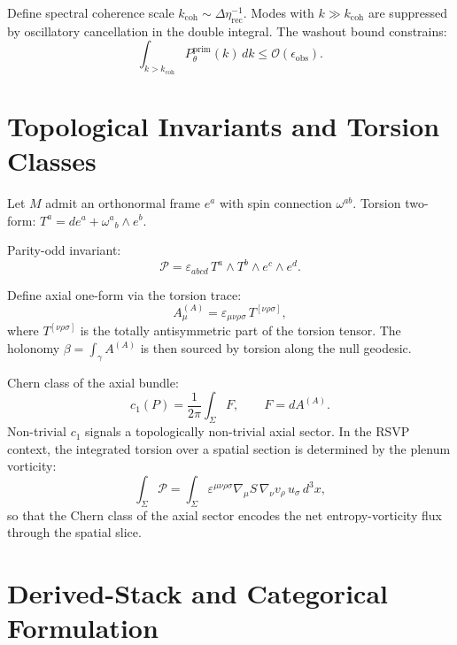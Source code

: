 \documentclass[12pt]{article}
\theoremstyle{definition}
\newcommand{\Wrec}{\Delta\eta_{\mathrm{rec}}}
\begin{document}
Define spectral coherence scale $k_{\mathrm{coh}}\sim\Wrec^{-1}$.
Modes with $k\gg k_{\mathrm{coh}}$ are suppressed by oscillatory
cancellation in the double integral.
The washout bound constrains:
\begin{equation}
  \int_{k>k_{\mathrm{coh}}}P_\theta^{\mathrm{prim}}(k)\,dk
  \leq\mathcal{O}(\epsilon_{\mathrm{obs}}).
\end{equation}

\section{Topological Invariants and Torsion Classes}
\label{app:torsion}

Let $M$ admit an orthonormal frame $e^a$ with spin connection $\omega^{ab}$.
Torsion two-form: $T^a=de^a+\omega^a{}_b\wedge e^b$.

Parity-odd invariant:
\begin{equation}
  \mathcal{P}=\varepsilon_{abcd}\,T^a\wedge T^b\wedge e^c\wedge e^d.
\end{equation}

Define axial one-form via the torsion trace:
\begin{equation}
  A^{(A)}_\mu=\varepsilon_{\mu\nu\rho\sigma}\,T^{[\nu\rho\sigma]},
\end{equation}
where $T^{[\nu\rho\sigma]}$ is the totally antisymmetric part of
the torsion tensor.
The holonomy $\beta=\int_\gamma A^{(A)}$ is then sourced by torsion along
the null geodesic.

Chern class of the axial bundle:
\begin{equation}
  c_1(P)=\frac{1}{2\pi}\int_\Sigma F,
  \qquad F=dA^{(A)}.
\end{equation}
Non-trivial $c_1$ signals a topologically non-trivial axial sector.
In the RSVP context, the integrated torsion over a spatial section is
determined by the plenum vorticity:
\begin{equation}
  \int_\Sigma\mathcal{P}
  =\int_\Sigma\varepsilon^{\mu\nu\rho\sigma}
   \nabla_\mu S\,\nabla_\nu v_\rho\,u_\sigma\,d^3x,
\end{equation}
so that the Chern class of the axial sector encodes the net
entropy-vorticity flux through the spatial slice.

\section{Derived-Stack and Categorical Formulation}
\label{app:derived}
\end{document}
